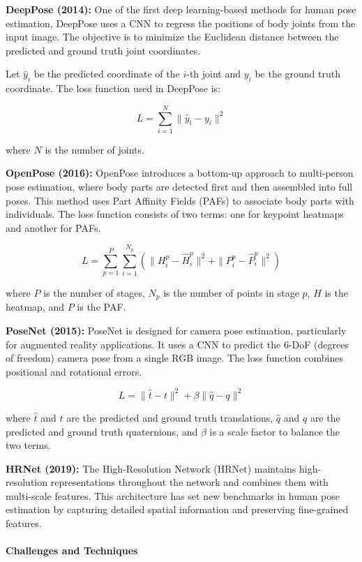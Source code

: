 \documentclass[12pt]{article}
\begin{document}
\textbf{DeepPose (2014):} One of the first deep learning-based methods for human pose estimation, DeepPose uses a CNN to regress the positions of body joints from the input image. The objective is to minimize the Euclidean distance between the predicted and ground truth joint coordinates.

Let \( \hat{y}_i \) be the predicted coordinate of the \( i \)-th joint and \( y_i \) be the ground truth coordinate. The loss function used in DeepPose is:

\[
L = \sum_{i=1}^N \| \hat{y}_i - y_i \|^2
\]

where \( N \) is the number of joints.

\textbf{OpenPose (2016):} OpenPose introduces a bottom-up approach to multi-person pose estimation, where body parts are detected first and then assembled into full poses. This method uses Part Affinity Fields (PAFs) to associate body parts with individuals. The loss function consists of two terms: one for keypoint heatmaps and another for PAFs.

\[
L = \sum_{p=1}^P \sum_{i=1}^{N_p} \left( \| H_i^p - \hat{H}_i^p \|^2 + \| P_i^p - \hat{P}_i^p \|^2 \right)
\]

where \( P \) is the number of stages, \( N_p \) is the number of points in stage \( p \), \( H \) is the heatmap, and \( P \) is the PAF.

\textbf{PoseNet (2015):} PoseNet is designed for camera pose estimation, particularly for augmented reality applications. It uses a CNN to predict the 6-DoF (degrees of freedom) camera pose from a single RGB image. The loss function combines positional and rotational errors.

\[
L = \| \hat{t} - t \|^2 + \beta \| \hat{q} - q \|^2
\]

where \( \hat{t} \) and \( t \) are the predicted and ground truth translations, \( \hat{q} \) and \( q \) are the predicted and ground truth quaternions, and \( \beta \) is a scale factor to balance the two terms.

\textbf{HRNet (2019):} The High-Resolution Network (HRNet) maintains high-resolution representations throughout the network and combines them with multi-scale features. This architecture has set new benchmarks in human pose estimation by capturing detailed spatial information and preserving fine-grained features.

\paragraph{Challenges and Techniques}
\end{document}
